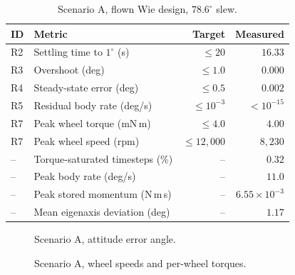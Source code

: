 \documentclass[conference,10pt,a4paper]{IEEEtran}
\newif\ifdraftmode
\newcommand{\figplaceholder}[2]{%
  \ifdraftmode
    \setlength{\fboxsep}{4pt}%
    \fbox{%
      \parbox[c][#1][c]{\dimexpr\linewidth-2\fboxsep-2\fboxrule\relax}{%
        \centering\scriptsize\textsc{figure placeholder}\\[3pt]
        \itshape #2}}%
  \else
    \parbox[c][#1][c]{\linewidth}{}%
  \fi}
\newcommand{\unit}[1]{\ensuremath{\,\mathrm{#1}}}
\begin{document}
\begin{table}[!t]
\centering
\caption{Scenario A, flown Wie design, $78.6^\circ$ slew.}
\label{tab:results_slew}
\footnotesize
\begin{tabular}{@{}llrr@{}}
\toprule
\textbf{ID} & \textbf{Metric} & \textbf{Target} & \textbf{Measured} \\
\midrule
R2 & Settling time to $1^\circ$ (s)  & $\le20$    & $16.33$ \\
R3 & Overshoot (deg)                 & $\le1.0$   & $0.000$ \\
R4 & Steady-state error (deg)        & $\le0.5$   & $0.002$ \\
R5 & Residual body rate (deg/s)      & $\le10^{-3}$ & $<10^{-15}$ \\
R7 & Peak wheel torque (mN\,m)       & $\le4.0$   & $4.00$ \\
R7 & Peak wheel speed (rpm)          & $\le12{,}000$ & $8{,}230$ \\
-- & Torque-saturated timesteps (\%) & --         & $0.32$ \\
-- & Peak body rate (deg/s)          & --         & $11.0$ \\
-- & Peak stored momentum (N\,m\,s)  & --         & $6.55\times10^{-3}$ \\
-- & Mean eigenaxis deviation (deg)  & --         & $1.17$ \\
\bottomrule
\end{tabular}
\end{table}

\begin{figure}[!t]
\centering
\figplaceholder{42mm}{Error angle $\theta_e=2\arccos|\delta q_0|$ on a log
scale with the $1^\circ$ settling band shaded and the settling time annotated.
Generated by \texttt{deimos run --plots attitude\_error}.}
\caption{Scenario A, attitude error angle.}
\label{fig:slew_error}
\end{figure}

\begin{figure}[!t]
\centering
\figplaceholder{52mm}{Wheel speeds above, per-wheel torques below, all three
wheels, with the $12{,}000\unit{rpm}$ and $4.0\times10^{-3}\unit{N\,m}$ limits
drawn so R7 compliance is visible. Generated by \texttt{deimos run --plots
wheel\_panel,torque\_envelope,saturation}.}
\caption{Scenario A, wheel speeds and per-wheel torques.}
\label{fig:slew_wheels}
\end{figure}
\end{document}
